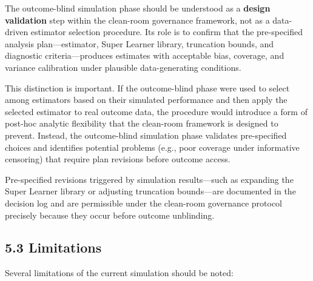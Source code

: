 \documentclass[
  letterpaper,
  DIV=11,
  numbers=noendperiod]{scrartcl}
\begin{document}
The outcome-blind simulation phase should be understood as a
\textbf{design validation} step within the clean-room governance
framework, not as a data-driven estimator selection procedure. Its role
is to confirm that the pre-specified analysis plan---estimator, Super
Learner library, truncation bounds, and diagnostic criteria---produces
estimates with acceptable bias, coverage, and variance calibration under
plausible data-generating conditions.

This distinction is important. If the outcome-blind phase were used to
select among estimators based on their simulated performance and then
apply the selected estimator to real outcome data, the procedure would
introduce a form of post-hoc analytic flexibility that the clean-room
framework is designed to prevent. Instead, the outcome-blind simulation
phase validates pre-specified choices and identifies potential problems
(e.g., poor coverage under informative censoring) that require plan
revisions before outcome access.

Pre-specified revisions triggered by simulation results---such as
expanding the Super Learner library or adjusting truncation bounds---are
documented in the decision log and are permissible under the clean-room
governance protocol precisely because they occur before outcome
unblinding.

\subsection{5.3 Limitations}\label{limitations}

Several limitations of the current simulation should be noted:
\end{document}
